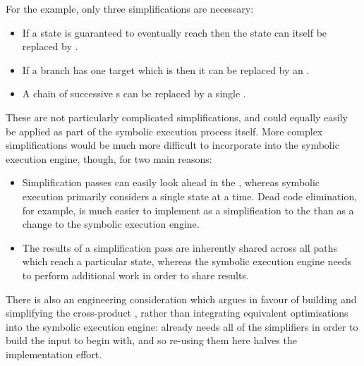 For the example, only three simplifications are necessary:

\begin{itemize}
\item If a state is guaranteed to eventually reach 
  then the state can itself be replaced by .
\item If a branch has one target which is  then
  it can be replaced by an .
\item A chain of successive s can be replaced by a
  single .
\end{itemize}

These are not particularly complicated simplifications, and could
equally easily be applied as part of the symbolic execution process
itself.  More complex simplifications would be much more difficult to
incorporate into the symbolic execution engine, though, for two main
reasons:

\begin{itemize}
\item Simplification passes can easily look ahead in the
  {\StateMachine}, whereas symbolic execution primarily considers a
  single state at a time.  Dead code elimination, for example, is much
  easier to implement as a simplification to the {\StateMachine} than
  as a change to the symbolic execution engine.
\item The results of a simplification pass are inherently shared
  across all paths which reach a particular state, whereas the
  symbolic execution engine needs to perform additional work in order
  to share results.
\end{itemize}

There is also an engineering consideration which argues in favour of
building and simplifying the cross-product {\StateMachine}, rather
than integrating equivalent optimisations into the symbolic execution
engine: {\technique} already needs all of the simplifiers in order to
build the input {\StateMachines} to begin with, and so re-using them
here halves the implementation effort.

